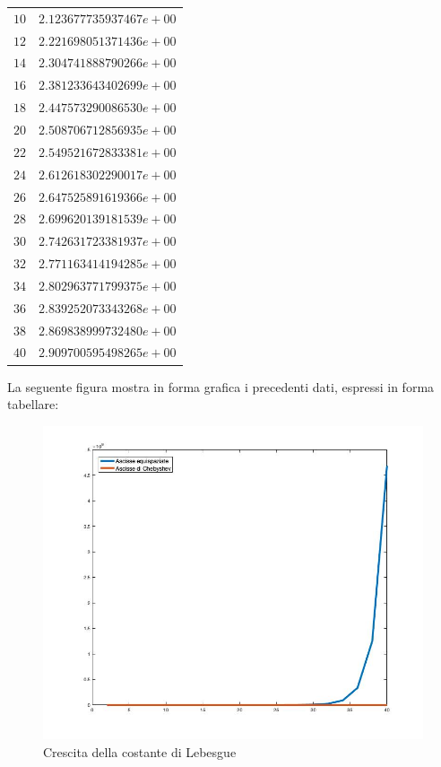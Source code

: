 \begin{table}[H]
\begin{minipage}{0.5\textwidth}
\begin{tabular}{|c|c|}
			$10$ & $2.123677735937467e+00$ \\
			$12$ & $2.221698051371436e+00$ \\
			$14$ & $2.304741888790266e+00$ \\
			$16$ & $2.381233643402699e+00$ \\
			$18$ & $2.447573290086530e+00$ \\
			$20$ & $2.508706712856935e+00$ \\
			$22$ & $2.549521672833381e+00$ \\
			$24$ & $2.612618302290017e+00$ \\
			$26$ & $2.647525891619366e+00$ \\
			$28$ & $2.699620139181539e+00$ \\
			$30$ & $2.742631723381937e+00$ \\
			$32$ & $2.771163414194285e+00$ \\
			$34$ & $2.802963771799375e+00$ \\
			$36$ & $2.839252073343268e+00$ \\
			$38$ & $2.869838999732480e+00$ \\
			$40$ & $2.909700595498265e+00$ \\
			\hline
		\end{tabular}
	\end{minipage}
\end{table}

La seguente figura mostra in forma grafica i precedenti dati, espressi in forma tabellare:
\begin{figure}[H]
	\includegraphics[width=\textwidth]{Chapter-4/Exercise-19/plot_lebesgue.jpg}
	\caption*{Crescita della costante di Lebesgue}
\end{figure}

